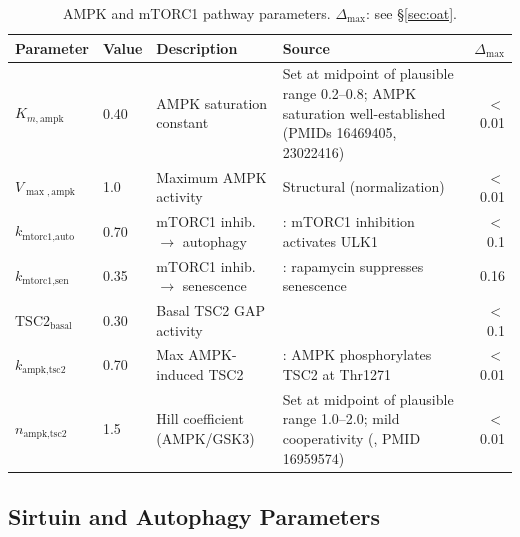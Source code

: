 \documentclass[11pt]{article}
\begin{document}
\begin{table}[H]
\centering
\caption{AMPK and mTORC1 pathway parameters. $\Delta_{\max}$: see \S\ref{sec:oat}.}
\begin{tabular}{|ll|p{3cm}|p{6cm}|r|}
\hline
Parameter & Value & Description & Source & $\Delta_{\max}$ \\
\hline
$K_{m,\text{ampk}}$ & 0.40 & AMPK saturation constant & Set at midpoint of plausible range 0.2--0.8; AMPK saturation well-established (PMIDs 16469405, 23022416) & $<$0.01 \\
\hline
$V_{\max,\text{ampk}}$ & 1.0 & Maximum AMPK activity & Structural (normalization) & $<$0.01 \\
\hline
$k_{\text{mtorc1,auto}}$ & 0.70 & mTORC1 inhib.\ $\to$ autophagy & \citet{Kim2011}: mTORC1 inhibition activates ULK1 & $<$0.1 \\
\hline
$k_{\text{mtorc1,sen}}$ & 0.35 & mTORC1 inhib.\ $\to$ senescence & \citet{Demidenko2009}: rapamycin suppresses senescence & 0.16 \\
\hline
$\text{TSC2}_{\text{basal}}$ & 0.30 & Basal TSC2 GAP activity & \citet{Huang2008} & $<$0.1 \\
\hline
$k_{\text{ampk,tsc2}}$ & 0.70 & Max AMPK-induced TSC2 & \citet{Inoki2003}: AMPK phosphorylates TSC2 at Thr1271 & $<$0.01 \\
\hline
$n_{\text{ampk,tsc2}}$ & 1.5 & Hill coefficient (AMPK/GSK3) & Set at midpoint of plausible range 1.0--2.0; mild cooperativity (\citet{Inoki2003}, PMID 16959574) & $<$0.01 \\
\hline
\end{tabular}
\end{table}

\subsection{Sirtuin and Autophagy Parameters}
\end{document}
